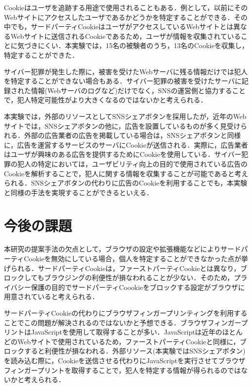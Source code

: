 \documentclass[10pt, a4paper]{jreport}
\begin{document}
Cookieはユーザを追跡する用途で使用されることもある．例として，以前にそのWebサイトにアクセスしたユーザであるかどうかを特定することができる．その中でも，サードパーティCookieはユーザがアクセスしているWebサイトとは異なるWebサイトに送信されるCookieであるため，ユーザが情報を収集されていることに気づきにくい．本実験では，15名の被験者のうち，13名のCookieを収集し，特定することができた．

サイバー犯罪が発生した際に，被害を受けたWebサーバに残る情報だけでは犯人を特定することができない場合もある．サイバー犯罪の被害を受けたサーバに記録された情報(Webサーバのログなど)だけでなく，SNSの運営側と協力することで，犯人特定可能性がより大きくなるのではないかと考えられる．

本実験では，外部のリソースとしてSNSシェアボタンを採用したが，近年のWebサイトでは，SNSシェアボタンの他に，広告を設置しているものが多く見受けられる．外部の広告業者の広告を掲載している場合は，SNSシェアボタンと同様に，広告を運営するサービスのサーバにCookieが送信される．実際に，広告業者はユーザが興味のある広告を提供するためにCookieを使用している\cite{third_party_cookie_is_danger}．サイバー犯罪の犯人の特定においては，ユーザビリティ向上の目的で使用されている広告のCookieを解析することで，犯人に関する情報を収集することが可能であると考えられる．SNSシェアボタンの代わりに広告のCookieを利用することでも，本実験と同様の手法を実現することができるといえる．

\section{今後の課題}
本研究の提案手法の欠点として，ブラウザの設定や拡張機能などによりサードパーティCookieを無効にしている場合，個人を特定することができなかった点が挙げられる．サードパーティCookieは，ファーストパーティCookieとは異なり，ブロックしてもブラウジングの利便性が損なわれることが少ない．そのため，プライバシー保護の目的でサードパーティCoookieをブロックする設定がブラウザに用意されていると考えられる．

サードパーティCookieの代わりにブラウザフィンガープリンティングを利用することでこの問題が解決されるのではないかと予想できる．ブラウザフィンガープリントはJavaScriptを使用して取得することが多い．JavaScriptは近年のほとんどのWebサイトで使用されているため，ファーストパーティCookieと同様に，ブロックすると利便性が損なわれる．外部リソース(本実験ではSNSシェアボタン)を読み込む際に，Cookieを送信させる代わりにJavaScriptを実行させてブラウザフィンガープリントを取得することで，犯人を特定する情報が得られるのではないかと考えられる．
\end{document}
